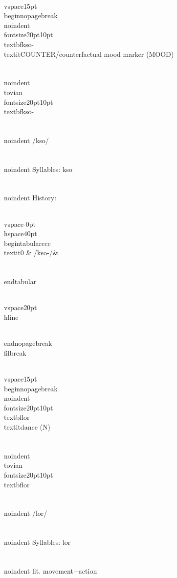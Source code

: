 \\vspace{15pt}
\\begin{nopagebreak}
\\noindent{\\fontsize{20pt}{10pt}\\textbf{kso-} } \\textit{COUNTER/counterfactual mood marker} (MOOD)\\\\
\\noindent {\\tovian \\fontsize{20pt}{10pt} \\textbf{kso-} }\\\\
\\noindent /ks{\textprimstress}o/\\\\
\\noindent Syllables: kso\\\\


\\noindent History:

\\vspace{-0pt}
\\hspace{40pt}
\\begin{tabular}{ccc}
\\textit{0} & /kso-/& \\\\
\\end{tabular}

\\vspace{20pt}\\hline

\\end{nopagebreak}
\\filbreak



\\vspace{15pt}
\\begin{nopagebreak}
\\noindent{\\fontsize{20pt}{10pt}\\textbf{lor} } \\textit{dance} (N)\\\\
\\noindent {\\tovian \\fontsize{20pt}{10pt} \\textbf{lor} }\\\\
\\noindent /l{\textprimstress}or/\\\\
\\noindent Syllables: lor\\\\
\\noindent lit. movement+action\\\\


